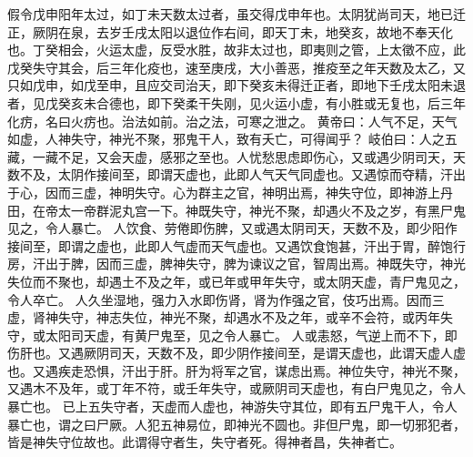 \documentclass[a4paper,12pt,UTF8,twoside]{ctexbook}
\begin{document}
假令戊申阳年太过，如丁未天数太过者，虽交得戊申年也。太阴犹尚司天，地已迁正，厥阴在泉，去岁壬戌太阳以退位作右间，即天丁未，地癸亥，故地不奉天化也。丁癸相会，火运太虚，反受水胜，故非太过也，即夷则之管，上太徵不应，此戊癸失守其会，后三年化疫也，速至庚戌，大小善恶，推疫至之年天数及太乙，又只如戊申，如戊至申，且应交司治天，即下癸亥未得迁正者，即地下壬戌太阳未退者，见戊癸亥未合德也，即下癸柔干失刚，见火运小虚，有小胜或无复也，后三年化疠，名曰火疠也。治法如前。治之法，可寒之泄之。
黄帝曰：人气不足，天气如虚，人神失守，神光不聚，邪鬼干人，致有夭亡，可得闻乎？
岐伯曰：人之五藏，一藏不足，又会天虚，感邪之至也。人忧愁思虑即伤心，又或遇少阴司天，天数不及，太阴作接间至，即谓天虚也，此即人气天气同虚也。又遇惊而夺精，汗出于心，因而三虚，神明失守。心为群主之官，神明出焉，神失守位，即神游上丹田，在帝太一帝群泥丸宫一下。神既失守，神光不聚，却遇火不及之岁，有黑尸鬼见之，令人暴亡。
人饮食、劳倦即伤脾，又或遇太阴司天，天数不及，即少阳作接间至，即谓之虚也，此即人气虚而天气虚也。又遇饮食饱甚，汗出于胃，醉饱行房，汗出于脾，因而三虚，脾神失守，脾为谏议之官，智周出焉。神既失守，神光失位而不聚也，却遇土不及之年，或已年或甲年失守，或太阴天虚，青尸鬼见之，令人卒亡。
人久坐湿地，强力入水即伤肾，肾为作强之官，伎巧出焉。因而三虚，肾神失守，神志失位，神光不聚，却遇水不及之年，或辛不会符，或丙年失守，或太阳司天虚，有黄尸鬼至，见之令人暴亡。
人或恚怒，气逆上而不下，即伤肝也。又遇厥阴司天，天数不及，即少阴作接间至，是谓天虚也，此谓天虚人虚也。又遇疾走恐惧，汗出于肝。肝为将军之官，谋虑出焉。神位失守，神光不聚，又遇木不及年，或丁年不符，或壬年失守，或厥阴司天虚也，有白尸鬼见之，令人暴亡也。
已上五失守者，天虚而人虚也，神游失守其位，即有五尸鬼干人，令人暴亡也，谓之曰尸厥。人犯五神易位，即神光不圆也。非但尸鬼，即一切邪犯者，皆是神失守位故也。此谓得守者生，失守者死。得神者昌，失神者亡。
\end{document}
